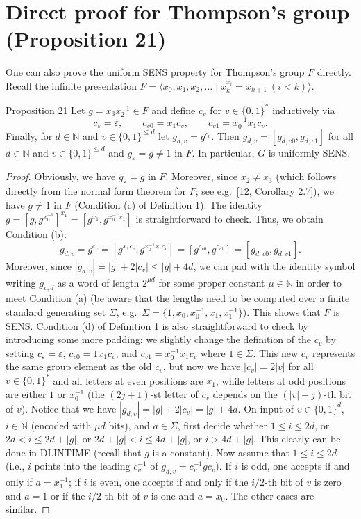 \section*{Direct proof for Thompson's group (Proposition 21)}
One can also prove the uniform SENS property for Thompson's group $F$ directly. Recall the infinite presentation $F=\langle x_0,x_1,x_2,\ldots\mid x_k^{x_i}=x_{k+1}\ (i<k)\rangle$.
\begin{authorclaim}{Proposition 21}
Let $g=x_3x_2^{-1}\in F$ and define $c_v$ for $v\in\{0,1\}^*$ inductively via
\[
c_\varepsilon=\varepsilon,\qquad c_{v0}=x_1c_v,\qquad c_{v1}=x_0^{-1}x_1c_v.
\]
Finally, for $d\in\mathbb N$ and $v\in\{0,1\}^{\le d}$ let $g_{d,v}=g^{c_v}$. Then $g_{d,v}=[g_{d,v0},g_{d,v1}]$ for all $d\in\mathbb N$ and $v\in\{0,1\}^{\le d}$ and $g_\varepsilon=g\ne1$ in $F$. In particular, $G$ is uniformly SENS.
\end{authorclaim}
\begin{proof}
Obviously, we have $g_\varepsilon=g$ in $F$. Moreover, since $x_2\ne x_3$ (which follows directly from the normal form theorem for $F$; see e.g.\ [12, Corollary 2.7]), we have $g\ne1$ in $F$ (Condition (c) of Definition 1). The identity $g=[g,g^{x_0^{-1}}]^{x_1}=[g^{x_1},g^{x_0^{-1}x_1}]$ is straightforward to check. Thus, we obtain Condition (b):
\[
g_{d,v}=g^{c_v}=[g^{x_1c_v},g^{x_0^{-1}x_1c_v}]
=[g^{c_{v0}},g^{c_{v1}}]=[g_{d,v0},g_{d,v1}].
\]
Moreover, since $|g_{d,v}|=|g|+2|c_v|\le|g|+4d$, we can pad with the identity symbol writing $g_{v,d}$ as a word of length $2^{\mu d}$ for some proper constant $\mu\in\mathbb N$ in order to meet Condition (a) (be aware that the lengths need to be computed over a finite standard generating set $\Sigma$, e.g.\ $\Sigma=\{1,x_0,x_0^{-1},x_1,x_1^{-1}\}$). This shows that $F$ is SENS.
Condition (d) of Definition 1 is also straightforward to check by introducing some more padding: we slightly change the definition of the $c_v$ by setting $c_\varepsilon=\varepsilon$, $c_{v0}=1x_1c_v$, and $c_{v1}=x_0^{-1}x_1c_v$ where $1\in\Sigma$. This new $c_v$ represents the same group element as the old $c_v$, but now we have $|c_v|=2|v|$ for all $v\in\{0,1\}^*$ and all letters at even positions are $x_1$, while letters at odd positions are either $1$ or $x_0^{-1}$ (the $(2j+1)$-st letter of $c_v$ depends on the $(|v|-j)$-th bit of $v$). Notice that we have $|g_{d,v}|=|g|+2|c_v|=|g|+4d$.
On input of $v\in\{0,1\}^d$, $i\in\mathbb N$ (encoded with $\mu d$ bits), and $a\in\Sigma$, first decide whether $1\le i\le2d$, or $2d<i\le2d+|g|$, or $2d+|g|<i\le4d+|g|$, or $i>4d+|g|$. This clearly can be done in DLINTIME (recall that $g$ is a constant). Now assume that $1\le i\le2d$ (i.e., $i$ points into the leading $c_v^{-1}$ of $g_{d,v}=c_v^{-1}gc_v$). If $i$ is odd, one accepts if and only if $a=x_1^{-1}$; if $i$ is even, one accepts if and only if the $i/2$-th bit of $v$ is zero and $a=1$ or if the $i/2$-th bit of $v$ is one and $a=x_0$. The other cases are similar.
\end{proof}
